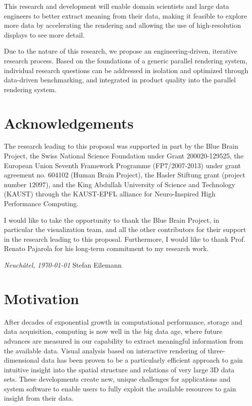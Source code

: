 This research and development will enable domain scientists and large data
engineers to better extract meaning from their data, making it feasible to
explore more data by accelerating the rendering and allowing the use of
high-resolution displays to see more detail.

Due to the nature of this research, we propose an engineering-driven, iterative
research process. Based on the foundations of a generic parallel rendering
system, individual research questions can be addressed in isolation and
optimized through data-driven benchmarking, and integrated in product quality
into the parallel rendering system.

\vfill

\section*{Acknowledgements}

The research leading to this proposal was supported in part by the Blue Brain
Project, the Swiss National Science Foundation under Grant 200020-129525, the
European Union Seventh Framework Programme (FP7/2007-2013) under grant agreement
no. 604102 (Human Brain Project), the Hasler Stiftung grant (project number
$12097$), and the King Abdullah University of Science and Technology (KAUST)
through the KAUST-EPFL alliance for Neuro-Inspired High Performance Computing.

I would like to take the opportunity to thank the Blue Brain Project, in
particular the visualization team, and all the other contributors for their
support in the research leading to this proposal. Furthermore, I would like to
thank Prof. Renato Pajarola for his long-term commitment to my research work.

\bigskip
\noindent\textit{Neuch\^atel, \today}
\hfill Stefan Eilemann
\clearpage


\setlength{\parskip}{1em}

\section{Motivation} %

After decades of exponential growth in computational performance, storage and
data acquisition, computing is now well in the big data age, where future
advances are measured in our capability to extract meaningful information from
the available data. Visual analysis based on interactive rendering of
three-dimensional data has been proven to be a particularly efficient approach
to gain intuitive insight into the spatial structure and relations of very large
3D data sets. These developments create new, unique challenges for applications
and system software to enable users to fully exploit the available resources to
gain insight from their data.

